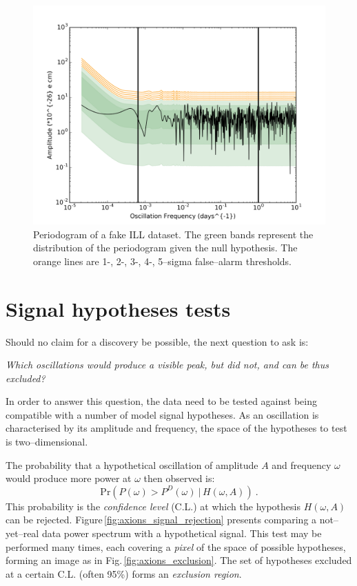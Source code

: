 \begin{figure}[h!]
  \begin{center}
    \includegraphics[width=\columnwidth]{gfx/axions/ILL_detection_Periodogram.png}
    \caption{Periodogram of a fake ILL dataset. The green bands represent the distribution of the periodogram given the null hypothesis. The orange lines are 1-, 2-, 3-, 4-, 5--sigma false--alarm thresholds.}
    \label{fig:ILL_detection}
  \end{center}
\end{figure}





\section{Signal hypotheses tests}
Should no claim for a discovery be possible, the next question to ask is:
\begin{center}
  \emph{Which oscillations would produce a visible peak, but did not, and can be thus excluded?}
\end{center}
In order to answer this question, the data need to be tested against being compatible with a number of model signal hypotheses. As an oscillation is characterised by its amplitude and frequency, the space of the hypotheses to test is two--dimensional.

The probability that a hypothetical oscillation of amplitude $A$ and frequency $\omega$ would produce more power at $\omega$ then observed is:
\begin{equation}
  \mathrm{Pr}\left( P(\omega) > P^D(\omega)\ |\, H(\omega, A) \right) \ .
\end{equation}
This probability is the \emph{confidence level} (C.L.) at which the hypothesis $H(\omega, A)$ can be rejected. Figure\,\ref{fig:axions_signal_rejection} presents comparing a not--yet--real data power spectrum with a hypothetical signal. This test may be performed many times, each covering a \emph{pixel} of the space of possible hypotheses, forming an image as in Fig.\,\ref{fig:axions_exclusion}. The set of hypotheses excluded at a certain C.L. (often 95\%) forms an \emph{exclusion region}.


